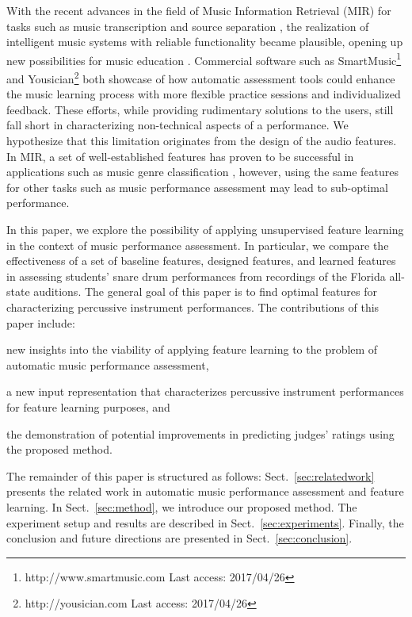 \documentclass{article}
\begin{document}
With the recent advances in the field of Music Information Retrieval (MIR) for tasks such as music transcription \cite{Benetos2013} and source separation \cite{Huang2014}, the realization of intelligent music systems with reliable functionality became plausible, opening up new possibilities for music education \cite{Dittmar2012}. Commercial software such as SmartMusic\footnote{http://www.smartmusic.com Last access: 2017/04/26} and Yousician\footnote{http://yousician.com Last access: 2017/04/26} both showcase of how automatic assessment tools could enhance the music learning process with more flexible practice sessions and individualized feedback. These efforts, while providing rudimentary solutions to the users, still fall short in characterizing non-technical aspects of a performance. We hypothesize that this limitation originates from the design of the audio features. In MIR, a set of well-established features has proven to be successful in applications such as music genre classification \cite{Tzanetakis2002}, however, using the same features for other tasks such as music performance assessment may lead to sub-optimal performance. %

In this paper, we explore the possibility of applying unsupervised feature learning in the context of music performance assessment. In particular, we compare the effectiveness of a set of baseline features, designed features, and learned features in assessing students' snare drum performances from recordings of the Florida all-state auditions. The general goal of this paper is to find optimal features for characterizing percussive instrument performances. The contributions of this paper include:
\begin{inparaenum}[(i)]
	\item   new insights into the viability of applying feature learning to the problem of automatic music performance assessment, 
    \item   a new input representation that characterizes percussive instrument performances for feature learning purposes, and 
    \item   the demonstration of potential improvements in predicting judges' ratings using the proposed method.
\end{inparaenum} 

The remainder of this paper is structured as follows: Sect.~\ref{sec:relatedwork} presents the related work in automatic music performance assessment and feature learning. In Sect.~\ref{sec:method}, we introduce our proposed method. The experiment setup and results are described in Sect.~\ref{sec:experiments}. Finally, the conclusion and future directions are presented in Sect.~\ref{sec:conclusion}.
\end{document}
